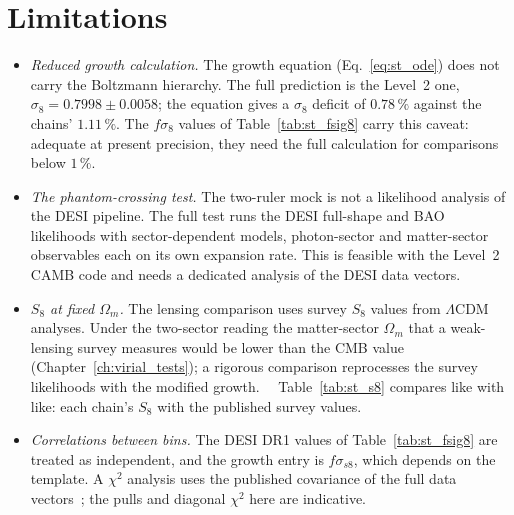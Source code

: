 \section{Limitations}\label{sec:ph_limits}
\begin{itemize}
\item \emph{Reduced growth calculation.} The growth equation (Eq.~\ref{eq:st_ode}) does not carry the Boltzmann hierarchy. The full prediction is the
Level~2 one, $\sigma_8=0.7998\pm0.0058$; the equation gives a $\sigma_8$ deficit of $0.78\,\%$ against the chains' $1.11\,\%$. The $f\sigma_8$ values of
Table~\ref{tab:st_fsig8} carry this caveat: adequate at present precision, they need the full calculation for comparisons below $1\,\%$.
\item \emph{The phantom-crossing test.} The two-ruler mock is not a likelihood analysis of the DESI pipeline. The full test runs the DESI full-shape and
BAO likelihoods with sector-dependent models, photon-sector and matter-sector observables each on its own expansion rate. This is feasible with the
Level~2 CAMB code and needs a dedicated analysis of the DESI data vectors. \openprob
\item \emph{$S_8$ at fixed $\Omega_m$.} The lensing comparison uses survey $S_8$ values from $\Lambda$CDM analyses. Under the two-sector reading the
matter-sector $\Omega_m$ that a weak-lensing survey measures would be lower than the CMB value (Chapter~\ref{ch:virial_tests}); a rigorous comparison
reprocesses the survey likelihoods with the modified growth. \interp\ \openprob\ Table~\ref{tab:st_s8} compares like with like: each chain's $S_8$
with the published survey values.
\item \emph{Correlations between bins.} The DESI DR1 values of Table~\ref{tab:st_fsig8} are treated as independent, and the growth entry is
$f\sigma_{s8}$, which depends on the template. A $\chi^2$ analysis uses the published covariance of the full data vectors~\cite{DESI2024V}; the pulls
and diagonal $\chi^2$ here are indicative.
\end{itemize}

